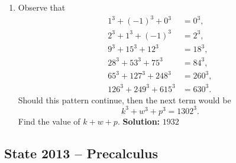 \documentclass[10pt]{article}
\begin{document}
\begin{enumerate}
\item Observe that
\[
\begin{aligned}
1^3+(-1)^3+0^3&=0^3,\\
2^3+1^3+(-1)^3&=2^3,\\
9^3+15^3+12^3&=18^3,\\
28^3+53^3+75^3&=84^3,\\
65^3+127^3+248^3&=260^3,\\
126^3+249^3+615^3&=630^3.
\end{aligned}
\]
Should this pattern continue, then the next term would be
\[
k^3+w^3+p^3=1302^3.
\]
Find the value of \(k+w+p\). \quad\textbf{Solution:} \(1932\)
\end{enumerate}

\subsection*{State 2013 -- Precalculus}
\end{document}

